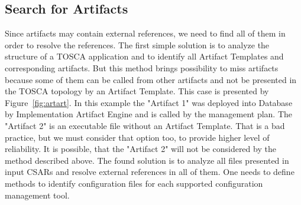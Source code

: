 \subsection{Search for Artifacts}\label{subs:searchart}
Since artifacts may contain external references, we need to find all of them in order to resolve the references.
The first simple solution is to analyze the structure of a TOSCA application and to identify all Artifact Templates and corresponding artifacts.
But this method brings possibility to miss artifacts because some of them can be called from other artifacts and not be presented in the TOSCA topology by an Artifact Template.
This case is presented by Figure~\ref{fig:artart}.
In this example the "Artifact 1" was deployed into Database by Implementation Artifact Engine and is called by the management plan.
The "Artifact 2" is an executable file without an Artifact Template.
That is a bad practice, but we must consider that option too, to provide higher level of reliability.
It is possible, that the "Artifact 2" will not be considered by the method described above.
The found solution is to analyze all files presented in input CSARs and resolve external references in all of them.
One needs to define methods to identify configuration files for each supported configuration management tool.


